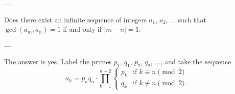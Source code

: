 
---

Does there exist an infinite sequence of integers $a_1$, $a_2$, $\ldots$ such that $\gcd(a_m,a_n)=1$ if and only if $|m-n|=1$.

---

The answer is yes. Label the primes $p_1$, $q_1$, $p_2$, $q_2$, $\ldots$, and take the sequence  \[a_n=p_nq_n\cdot\prod_{k=1}^{n-2}\begin{cases}p_k&\text{if }k\equiv n\pmod2\\ q_k&\text{if }k\not\equiv n\pmod 2.\end{cases}\]

